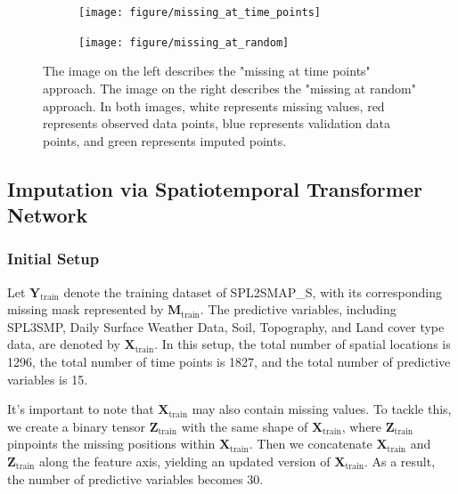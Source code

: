 \documentclass[11pt]{article}
\begin{document}
\begin{figure}[H]
     \centering
      \begin{subfigure}[b]{0.45\textwidth}
		\centering
		\texttt{[image: figure/missing\_at\_time\_points]}
		\caption{}
		\label{fig: missing at time points}
	 \end{subfigure}
         \hfill
      \begin{subfigure}[b]{0.45\textwidth}
         \texttt{[image: figure/missing\_at\_random]}
		 \caption{}
	\label{fig: missing at random}
     \end{subfigure}
    
     \caption{The image on the left describes the "missing at time points" approach. The image on the right describes the "missing at random" approach. In both images, white represents missing values, red represents observed data points, blue represents validation data points, and green represents imputed points.}
     \label{fig: missing pattern}
\end{figure}






\subsection{Imputation via Spatiotemporal Transformer Network}\label{sec: Imputation via Spatiotemporal Transformer Network}

\subsubsection*{Initial Setup}\label{sec: Model Training Setup}

Let $\boldsymbol{Y}_{\text{train}}$ denote the training dataset of SPL2SMAP\_S, with its corresponding missing mask represented by $\boldsymbol{M}_{\text{train}}$. The predictive variables, including SPL3SMP, Daily Surface Weather Data, Soil, Topography, and Land cover type data, are denoted by $\boldsymbol{X}_{\text{train}}$. In this setup, the total number of spatial locations is 1296, the total number of time points is 1827, and the total number of predictive variables is 15.


It's important to note that $\boldsymbol{X}_{\text{train}}$ may also contain missing values. To tackle this, we create a binary tensor $\boldsymbol{Z}_{\text{train}}$ with the same shape of $\boldsymbol{X}_{\text{train}}$, where $\boldsymbol{Z}_{\text{train}}$ pinpoints the missing positions within $\boldsymbol{X}_{\text{train}}$. Then we concatenate $\boldsymbol{X}_{\text{train}}$ and $\boldsymbol{Z}_{\text{train}}$ along the feature axis, yielding an updated version of $\boldsymbol{X}_{\text{train}}$. As a result, the number of predictive variables becomes 30.
\end{document}
